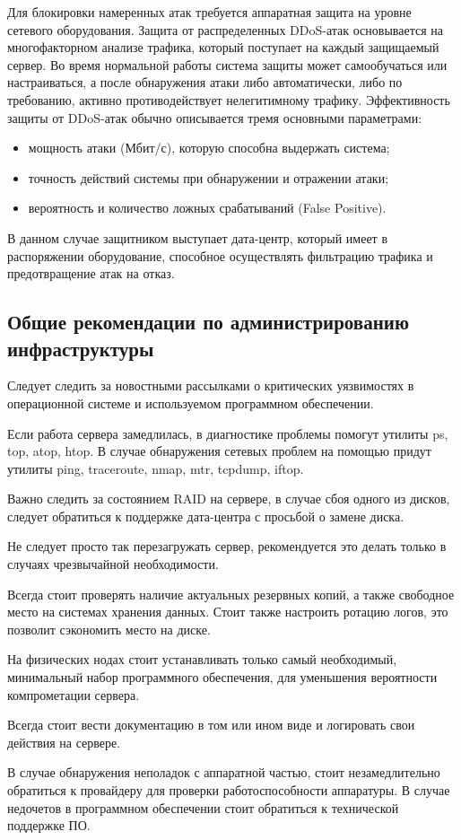 Для блокировки намеренных атак требуется аппаратная защита на уровне сетевого оборудования.
Защита от распределенных DDoS-атак основывается на мно­го­фак­тор­ном анализе трафика, который поступает на каждый защищаемый сервер.
Во время нормальной работы система защиты может самообучаться или настраиваться, а после обнаружения атаки либо автоматически, либо по требованию, активно про­тиво­дей­ству­ет нелегитимному трафику.
Эффективность защиты от DDoS-атак обычно описывается тремя основными параметрами:
\begin{itemize}
  \item мощность атаки (Мбит/с), которую способна выдержать система;
  \item точность действий системы при обнаружении и отражении атаки;
  \item вероятность и количество ложных срабатываний (False Positive).
\end{itemize}

В данном случае защитником выступает дата-центр, который имеет в распоряжении оборудование, способное осуществлять фильтрацию трафика и предотвращение атак на отказ.

\subsection{Общие рекомендации по администрированию инфраструктуры}

Следует следить за новостными рассылками о критических уязвимостях в операционной системе и используемом программном обеспечении.

Если работа сервера замедлилась, в диагностике проблемы помогут утилиты ps, top, atop, htop.
В случае обнаружения сетевых проблем на помощью придут утилиты ping, traceroute, nmap, mtr, tcpdump, iftop.

Важно следить за состоянием RAID на сервере, в случае сбоя одного из дисков, следует обратиться к поддержке дата-центра с просьбой о замене диска.

Не следует просто так перезагружать сервер, рекомендуется это делать только в случаях чрезвычайной необходимости.

Всегда стоит проверять наличие актуальных резервных копий, а также свободное место на системах хранения данных.
Стоит также настроить ротацию логов, это позволит сэкономить место на диске.

На физических нодах стоит устанавливать только самый необходимый, минимальный набор программного обеспечения, для уменьшения вероятности компрометации сервера.

Всегда стоит вести документацию в том или ином виде и логировать свои действия на сервере.

В случае обнаружения неполадок с аппаратной частью, стоит незамедлительно обратиться к провайдеру для проверки работоспособности аппаратуры.
В случае недочетов в программном обеспечении стоит обратиться к технической поддержке ПО.

\clearpage
